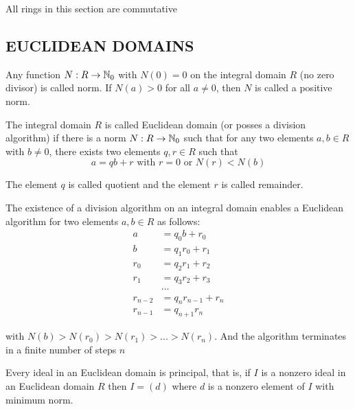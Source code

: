 \begin{remark}
	All rings in this section are commutative
\end{remark}

\subsection{EUCLIDEAN DOMAINS}

\begin{definition}
	Any function $N: R \to \mathbb{N}_0$ with $N(0) = 0$ on the integral domain $R$ (no zero divisor) is called norm. If $N(a) > 0$ for all $a \neq 0$, then $N$ is called a positive norm.
\end{definition}

\begin{definition}
	The integral domain $R$ is called Euclidean domain (or posses a division algorithm) if there is a norm $N: R \to \mathbb{N}_0$ such that for any two elements $a, b \in R$ with $b \neq 0$, there exists two elements $q, r \in R$ such that
	$$
		a = qb + r \text{ with } r = 0 \text{ or } N(r) < N(b)
	$$
	
	The element $q$ is called quotient and the element $r$ is called remainder.
\end{definition}

\begin{remark}
	The existence of a division algorithm on an integral domain enables a Euclidean algorithm for two elements $a, b \in R$ as follows:
	\begin{align*}
		a &= q_0 b + r_0 \\
		b &= q_1 r_0 + r_1 \\
		r_0 &= q_2 r_1 + r_2 \\
		r_1 &= q_3 r_2 + r_3 \\
		&... \\
		r_{n-2} &= q_n r_{n-1} + r_n \\
		r_{n-1} &= q_{n+1} r_n
	\end{align*}
	
	with $N(b) > N(r_0) > N(r_1) > ... > N(r_n)$. And the algorithm terminates in a finite number of steps $n$
\end{remark}

\begin{proposition}
	Every ideal in an Euclidean domain is principal, that is, if $I$ is a nonzero ideal in an Euclidean domain $R$ then $I = (d)$ where $d$ is a nonzero element of $I$ with minimum norm.
\end{proposition}

